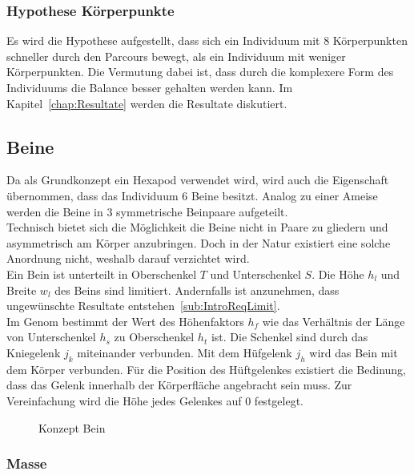       \subsubsection{Hypothese Körperpunkte\label{subsub:hypoKp}}

        Es wird die Hypothese aufgestellt,
        dass sich ein Individuum mit 8 Körperpunkten schneller durch den Parcours bewegt,
        als ein Individuum mit weniger Körperpunkten.
        Die Vermutung dabei ist, dass durch die komplexere Form des Individuums die Balance besser gehalten werden kann.
        Im Kapitel~\ref{chap:Resultate} werden die Resultate diskutiert.

    \subsection{Beine\label{sub:Beine}}

      Da als Grundkonzept ein \gls{Hexapod} verwendet wird, wird auch die Eigenschaft übernommen,
      dass das Individuum 6 Beine besitzt.
      Analog zu einer Ameise werden die Beine in 3 symmetrische Beinpaare aufgeteilt.
      \\
      Technisch bietet sich die Möglichkeit die Beine nicht in Paare zu gliedern und asymmetrisch am Körper anzubringen.
      Doch in der Natur existiert eine solche Anordnung nicht, weshalb darauf verzichtet wird.
      \\
      Ein Bein ist unterteilt in Oberschenkel \(T\) und Unterschenkel \(S\).
      Die Höhe \(h_{l}\) und Breite \(w_{l}\) des Beins sind limitiert.
      Andernfalls ist anzunehmen, dass ungewünschte Resultate entstehen~\vref{sub:IntroReqLimit}.
      \\
      Im Genom bestimmt der Wert des Höhenfaktors \(h_{f}\)
      wie das Verhältnis der Länge von Unterschenkel \(h_{s}\) zu Oberschenkel \(h_{t}\) ist.
      Die Schenkel sind durch das Kniegelenk \(j_{k}\) miteinander verbunden.
      Mit dem Hüfgelenk \(j_{h}\) wird das Bein mit dem Körper verbunden.
      Für die Position des Hüftgelenkes existiert die Bedinung,
      dass das Gelenk innerhalb der Körperfläche angebracht sein muss.
      Zur Vereinfachung wird die Höhe jedes Gelenkes auf 0 festgelegt.

      \begin{figure}[H]
        \centering
        
        \caption{Konzept Bein\label{fig:conceptLeg}}
      \end{figure}

      \subsubsection{Masse\label{subsub:Mass}}

